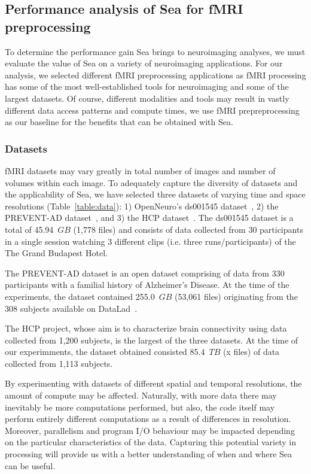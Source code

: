     \subsection{Performance analysis of Sea for fMRI preprocessing}
    
    To determine the performance gain Sea brings to neuroimaging analyses, we must evaluate the value of Sea on a variety of neuroimaging
    applications. For our analysis, we selected different fMRI preprocessing applications as fMRI processing has some of the most
    well-established tools for neuroimaging and some of the largest datasets. Of course, different modalities and tools may result in
    vastly different data access patterns and compute times, we use fMRI prepreprocessing as our baseline for the benefits that can be
    obtained with Sea. 
    
    
    
    \subsubsection{Datasets}
    fMRI datasets may vary greatly in total number
    of images and number of volumes within each image. To adequately capture the 
    diversity of datasets and the applicability of Sea, we have selected three datasets of varying
    time and space resolutions (Table~\ref{table:data}): 1) OpenNeuro's ds001545 dataset~\cite{ds001545},
    2) the PREVENT-AD dataset~\cite{preventad}, and 3) the HCP dataset~\cite{HCP}.
    The ds001545 dataset is a total of 45.94~$GB$ (1,778 files) and consists of data collected
    from 30 participants in a single session watching 3 different clips (i.e. three runs/participants) of the The Grand Budapest Hotel.
    
    
    The PREVENT-AD dataset is an open dataset comprising of data from 330 participants with a familial history
    of Alzheimer's Disease.
    At the time of the experiments, the dataset contained 255.0~$GB$ (53,061 files) originating from the 308 subjects available on DataLad~\cite{}.
    
    The HCP project, whose aim is to characterize brain connectivity using data collected from 1,200 subjects, is the largest of the three datasets.
    At the time of our experimments, the dataset obtained consisted 85.4~$TB$ (x files) of data collected from 1,113 subjects.
    
    By experimenting with datasets of different spatial and temporal resolutions, the amount of compute may be affected.
    Naturally, with more data there may inevitably be more computations performed, but also, the code itself may
    perform entirely different computations as a result of differences in resolution. Moreover, parallelism and program I/O behaviour
    may be impacted depending on the particular characteristics of the data. Capturing this potential
    variety in processing will provide us with a better understanding of when and where Sea can be useful.
    
